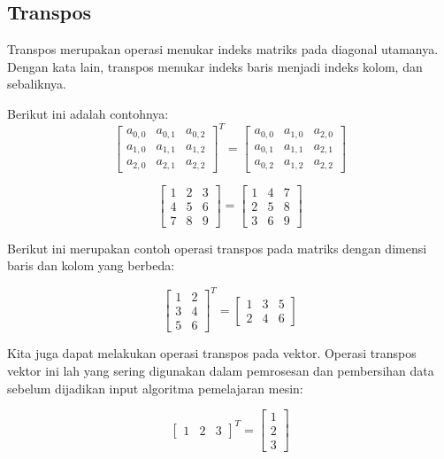 \subsection{Transpos}
Transpos merupakan operasi menukar indeks matriks pada diagonal utamanya. Dengan kata lain, transpos menukar indeks baris menjadi indeks kolom, dan sebaliknya.

Berikut ini adalah contohnya:
\[
    \begin{bmatrix}a_{0,0} & a_{0,1} & a_{0,2}\\ a_{1,0} & a_{1,1} & a_{1,2}\\a_{2,0} & a_{2,1} & a_{2,2}\end{bmatrix}^{T} = \begin{bmatrix}a_{0,0} & a_{1,0} & a_{2,0} \\ a_{0,1} & a_{1,1} & a_{2,1} \\ a_{0,2} & a_{1,2} & a_{2,2}\end{bmatrix}
\]

\[
\begin{bmatrix}1 & 2 & 3\\4 & 5 & 6\\7 & 8 & 9\end{bmatrix} = \begin{bmatrix} 1 & 4 & 7 \\ 2 & 5 & 8\\ 3 & 6 & 9\end{bmatrix}
\]

Berikut ini merupakan contoh operasi transpos pada matriks dengan dimensi baris dan kolom yang berbeda:

\[
\begin{bmatrix}1 & 2 \\ 3 & 4 \\ 5 & 6\end{bmatrix}^{T} = \begin{bmatrix}1 & 3 & 5\\2 & 4 & 6\end{bmatrix}
\]

Kita juga dapat melakukan operasi transpos pada vektor. Operasi transpos vektor ini lah yang sering digunakan dalam pemrosesan dan pembersihan data sebelum dijadikan input algoritma pemelajaran mesin:

\[
\begin{bmatrix} 1 & 2 & 3\end{bmatrix}^{T} = \begin{bmatrix} 1\\2\\3\end{bmatrix}
\]


